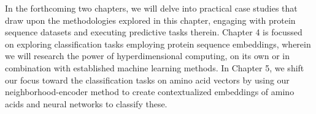 In the forthcoming two chapters, we will delve into practical case studies that draw upon the methodologies explored in this chapter, engaging with protein sequence datasets and executing predictive tasks therein. Chapter 4 is focussed on exploring classification tasks employing protein sequence embeddings, wherein we will research the power of hyperdimensional computing, on its own or in combination with established machine learning methods. In Chapter 5, we shift our focus toward the classification tasks on amino acid vectors by using our neighborhood-encoder method to create contextualized embeddings of amino acids and neural networks to classify these.